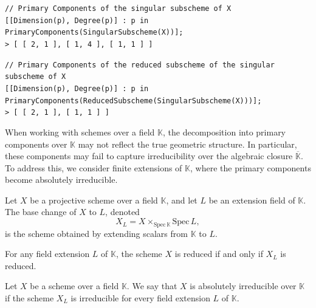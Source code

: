 \documentclass{amsart}
\begin{document}
\begin{example}
\begin{flushleft}
\texttt{// Primary Components of the singular subscheme of X} \\
\texttt{[[Dimension(p), Degree(p)] : p in PrimaryComponents(SingularSubscheme(X))];}\\
\texttt{> [ [ 2, 1 ], [ 1, 4 ], [ 1, 1 ] ]}
\end{flushleft}


\begin{flushleft}
\texttt{// Primary Components of the reduced subscheme of the singular subscheme of X} \\
\texttt{[[Dimension(p), Degree(p)] : p in PrimaryComponents(ReducedSubscheme(SingularSubscheme(X)))];}\\
\texttt{> [ [ 2, 1 ], [ 1, 1 ] ]}
\end{flushleft}

\end{example}

When working with schemes over a field \( \mathbb{K} \), the decomposition into primary components over \( \mathbb{K} \) may not reflect the true geometric structure. In particular, these components may fail to capture irreducibility over the algebraic closure \( \overline{\mathbb{K}} \). To address this, we consider finite extensions of \( \mathbb{K} \), where the primary components become absolutely irreducible. 

\begin{definition}\label{def:base-change}
Let \( X \) be a projective scheme over a field \( \mathbb{K} \), and let \( L \) be an extension field of \( \mathbb{K} \). The base change of \( X \) to \( L \), denoted
\[
X_L = X \times_{\mathrm{Spec}\,\mathbb{K}} \mathrm{Spec}\,L,
\]
is the scheme obtained by extending scalars from \( \mathbb{K} \) to \( L \).
\end{definition}

\begin{lemma}\textnormal{\cite[Tag 035X]{stacks-project}}\label{lemma:XLreduced}
For any field extension \( L \) of \( \mathbb{K} \), the scheme \( X \) is reduced if and only if \( X_L \) is reduced.
\end{lemma}

\begin{definition}\label{def:absolutely-irred}
Let \( X \) be a scheme over a field \( \mathbb{K} \). We say that \( X \) is absolutely irreducible over \( \mathbb{K} \) if the scheme \( X_L \) is irreducible for every field extension \( L \) of \( \mathbb{K} \).
\end{definition}
\end{document}
